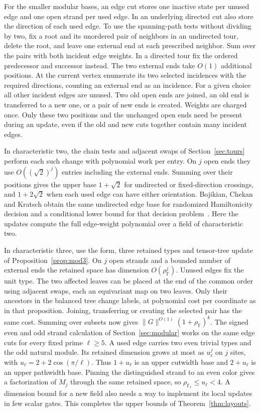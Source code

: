 \documentclass[11pt]{article}
\theoremstyle{definition}
\newcommand{\F}{\mathbb F}
\begin{document}
For the smaller modular bases, an edge cut stores one inactive state per unused edge and one open strand per used edge. In an underlying directed cut also store the direction of each used edge. To use the spanning-path tests without dividing by two, fix a root and its unordered pair of neighbors in an undirected tour, delete the root, and leave one external end at each prescribed neighbor. Sum over the pairs with both incident edge weights. In a directed tour fix the ordered predecessor and successor instead. The two external ends take \(O(1)\) additional positions. At the current vertex enumerate its two selected incidences with the required directions, counting an external end as an incidence. For a given choice all other incident edges are unused. Two old open ends are joined, an old end is transferred to a new one, or a pair of new ends is created. Weights are charged once. Only these two positions and the unchanged open ends need be present during an update, even if the old and new cuts together contain many incident edges.

In characteristic two, the chain tests and adjacent swaps of Section~\ref{sec:tours} perform each such change with polynomial work per entry. On \(j\) open ends they use \(O((\sqrt2)^j)\) entries including the external ends. Summing over their positions gives the upper base \(1+\sqrt2\) for undirected or fixed-direction crossings, and \(1+2\sqrt2\) when each used edge can have either orientation. Bojikian, Chekan and Kratsch obtain the same undirected edge base for randomized Hamiltonicity decision and a conditional lower bound for that decision problem~\cite{bck-cutwidth}. Here the updates compute the full edge-weight polynomial over a field of characteristic two.

In characteristic three, use the form, three retained types and tensor-tree update of Proposition~\ref{prop:mod3}. On \(j\) open strands and a bounded number of external ends the retained space has dimension \(O(\rho_\F^j)\). Unused edges fix the unit type. The two affected leaves can be placed at the end of the common order using adjacent swaps, each an equivariant map on two leaves. Only their ancestors in the balanced tree change labels, at polynomial cost per coordinate as in that proposition. Joining, transferring or creating the selected pair has the same cost. Summing over subsets now gives \(\|G\|^{O(1)}(1+\rho_\F)^k\). The signed even and odd strand calculation of Section~\ref{sec:modular} works on the same edge cuts for every fixed prime \(\ell\ge5\). A used edge carries two even trivial types and the odd natural module. Its retained dimension grows at most as \(u_\ell^j\) on \(j\) sites, with \(u_\ell=2+2\cos(\pi/\ell)\). Thus \(1+u_\ell\) is an upper cutwidth base and \(2+u_\ell\) is an upper pathwidth base. Pinning the distinguished strand to an even color gives a factorization of \(M_j\) through the same retained space, so \(\rho_{\mathbb F_\ell}\le u_\ell<4\). A dimension bound for a new field also needs a way to implement its local updates in few scalar gates. This completes the upper bounds of Theorem~\ref{thm:layouts}.
\end{document}
